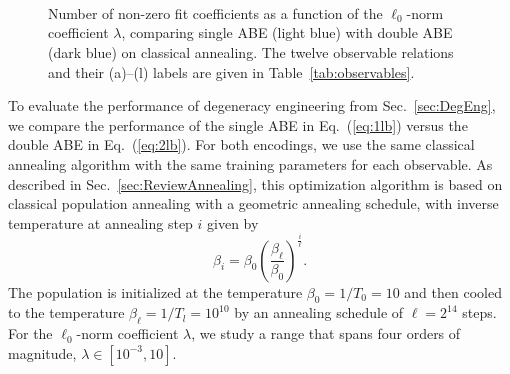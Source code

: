 \documentclass[aps,prd,twocolumn, superscriptaddress,preprintnumbers, nofootinbib,longbibliography,floatfix]{revtex4-2}
\DeclareRobustCommand{\Sec}[1]{Sec.~\ref{#1}}
\DeclareRobustCommand{\Tab}[1]{Table~\ref{#1}}
\DeclareRobustCommand{\Eq}[1]{Eq.~(\ref{#1})}
\begin{document}
\begin{figure*}
\centering
{}
\\
\\
\\
	\caption{
	Number of non-zero fit coefficients as a function of the $\ell_0$-norm coefficient $\lambda$, comparing single ABE (light blue) with double ABE (dark blue) on classical annealing.
	The twelve observable relations and their (a)--(l) labels are given in \Tab{tab:observables}.}
	\label{fig:double_vs_single_nnz}
\end{figure*}


To evaluate the performance of degeneracy engineering from \Sec{sec:DegEng}, we compare the performance of the single ABE in \Eq{eq:1lb} versus the double ABE in \Eq{eq:2lb}.
%
For both encodings, we use the same classical annealing algorithm with the same training parameters for each observable.
%
As described in \Sec{sec:ReviewAnnealing}, this optimization algorithm is based on classical population annealing with a geometric annealing schedule, with inverse temperature at annealing step $i$ given by
\begin{equation}
  \beta_i=\beta_0\left(\frac{\beta_\ell}{\beta_0}\right)^{\frac{i}{\ell}}.
  \label{eq:geo_sch}
\end{equation}
%
The population is initialized at the temperature $\beta_0=1/T_0 = 10$ and then cooled to the temperature $\beta_\ell=1/T_l = 10^{10}$ by an annealing schedule of $\ell=2^{14}$ steps.
%
For the $\ell_0$-norm coefficient $\lambda$, we study a range that spans four orders of magnitude, $\lambda \in [10^{-3},10]$. 
\end{document}
